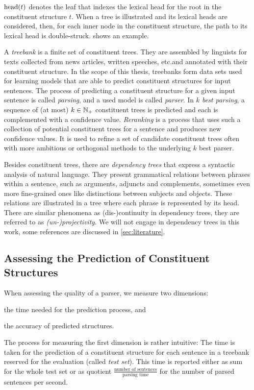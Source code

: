 \documentclass[../document.tex]{subfiles}
\begin{document}
    \(\operatorname{head}(t)\) denotes the leaf that indexes the lexical head for the root in the constituent structure \(t\).
    When a tree is illustrated and its lexical heads are considered, then, for each inner node in the constituent structure, the path to its lexical head is double-struck.
     shows an example.

    A \emph{treebank} is a finite set of constituent trees.
    They are assembled by linguists for texts collected from news articles, written speeches, etc.\@ and annotated with their constituent structure.
    In the scope of this thesis, treebanks form data sets used for learning models that are able to predict constituent structures for input sentences.
    The process of predicting a constituent structure for a given input sentence is called \emph{parsing}, and a used model is called \emph{parser}.
    In \emph{\(k\) best parsing}, a sequence of (at most) \(k \in \mathbb{N}_+\) constituent trees is predicted and each is complemented with a confidence value.
    \emph{Reranking} is a process that uses such a collection of potential constituent trees for a sentence and produces new confidence values.
    It is used to refine a set of candidate constituent trees often with more ambitious or orthogonal methods to the underlying \(k\) best parser.

    Besides constituent trees, there are \emph{dependency trees} that express a syntactic analysis of natural language.
    They present grammatical relations between phrases within a sentence, such as arguments, adjuncts and complements, sometimes even more fine-grained ones like distinctions between subjects and objects.
    These relations are illustrated in a tree where each phrase is represented by its head.
    There are similar phenomena as (dis-)continuity in dependency trees, they are referred to as \emph{(un-)projectivity}.
    We will not engage in dependency trees in this work, some references are discussed in \cref{sec:literature}.

    \subsection{Assessing the Prediction of Constituent Structures}
    When assessing the quality of a parser, we measure two dimensions:
    \begin{inparaenum}
        \item the time needed for the prediction process, and
        \item the accuracy of predicted structures.
    \end{inparaenum}
    The process for measuring the first dimension is rather intuitive:
    The time is taken for the prediction of a constituent structure for each sentence in a treebank reserved for the evaluation (called \emph{test set}).
    This time is reported either as sum for the whole test set or as quotient \(\frac{\text{number of sentences}}{\text{parsing time}}\) for the number of parsed sentences per second.
\end{document}
